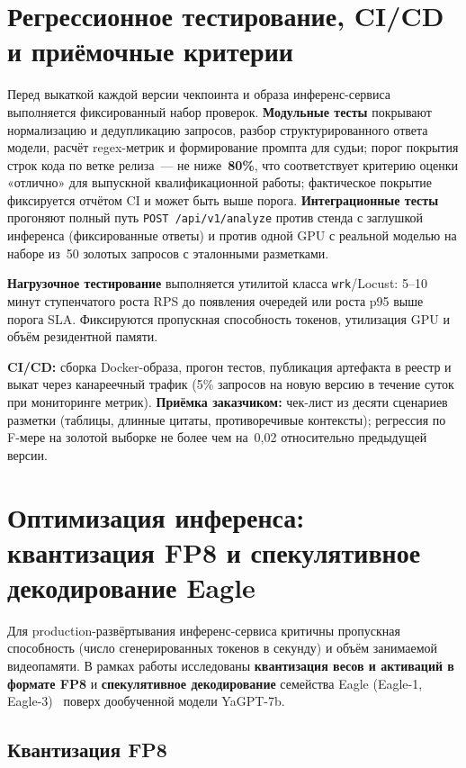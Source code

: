 \documentclass[times]{itmo-student-thesis}
\begin{document}
\section{Регрессионное тестирование, CI/CD и приёмочные критерии}

Перед выкаткой каждой версии чекпоинта и образа инференс-сервиса
выполняется фиксированный набор проверок. \textbf{Модульные тесты}
покрывают нормализацию и дедупликацию запросов, разбор структурированного ответа
модели, расчёт regex-метрик и формирование промпта для судьи;
порог покрытия строк кода по ветке релиза~--- не ниже~\textbf{80\%},
что соответствует критерию оценки «отлично» для выпускной квалификационной работы;
фактическое покрытие фиксируется отчётом CI и может быть выше порога.
\textbf{Интеграционные тесты} прогоняют полный путь
\texttt{POST /api/v1/analyze} против стенда с заглушкой инференса
(фиксированные ответы) и против одной GPU с реальной моделью
на наборе из~50 золотых запросов с эталонными разметками.

\textbf{Нагрузочное тестирование} выполняется утилитой класса
\texttt{wrk}/Locust: 5--10 минут ступенчатого роста RPS до появления
очередей или роста p95 выше порога SLA. Фиксируются пропускная
способность токенов, утилизация GPU и объём резидентной памяти.

\textbf{CI/CD:} сборка Docker-образа, прогон тестов, публикация
артефакта в реестр и выкат через канареечный трафик (5\% запросов
на новую версию в течение суток при мониторинге метрик).
\textbf{Приёмка заказчиком:} чек-лист из десяти сценариев разметки
(таблицы, длинные цитаты, противоречивые контексты); регрессия
по F-мере на золотой выборке не более чем на~0{,}02 относительно
предыдущей версии.

\section{Оптимизация инференса: квантизация FP8 и спекулятивное декодирование Eagle}

Для production-развёртывания инференс-сервиса критичны пропускная способность
(число сгенерированных токенов в секунду) и объём занимаемой видеопамяти.
В рамках работы исследованы \textbf{квантизация весов и активаций в формате
FP8} и \textbf{спекулятивное декодирование} семейства Eagle
(Eagle-1, Eagle-3)~\cite{li2024eagle} поверх дообученной модели YaGPT-7b.

\subsection{Квантизация FP8}
\end{document}
